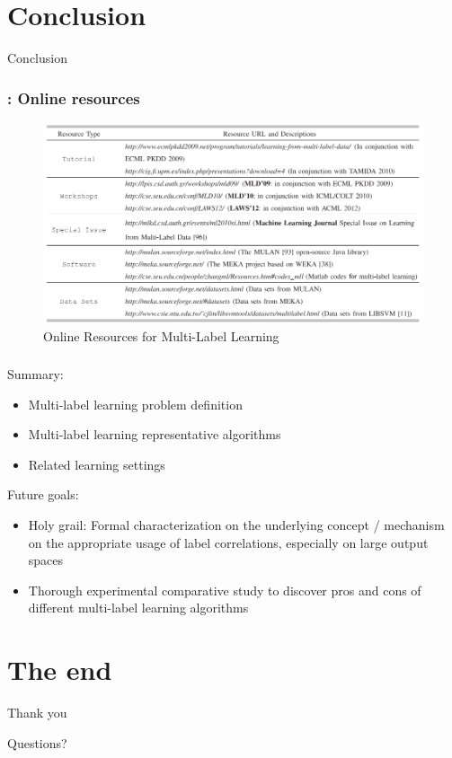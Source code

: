 \documentclass{beamer}
\begin{document}
\section{Conclusion}
\begin{frame}
\Huge{\centerline{Conclusion}}
\end{frame}
\begin{frame}
\frametitle{\insertsection : Online resources}
\begin{figure}
\begin{center}
\includegraphics[scale = 0.47]{images/online.png}
\caption{Online Resources for Multi-Label Learning}
\end{center}
\end{figure}
\end{frame}
\begin{frame}
\frametitle{\insertsection}
Summary:
\begin{itemize}
\item Multi-label learning problem definition
\item Multi-label learning representative algorithms
\item Related learning settings
\end{itemize}

Future goals:
\begin{itemize}
\item Holy grail: Formal characterization on the underlying concept / mechanism on the appropriate usage of label correlations, especially on large output spaces
\item Thorough experimental comparative study to discover pros and cons of different multi-label learning algorithms
\end{itemize}
\end{frame}

\section{The end}
\begin{frame}
\Huge{\centerline{Thank you}}
\Huge{\centerline{Questions?}}
\end{frame}
\end{document}
